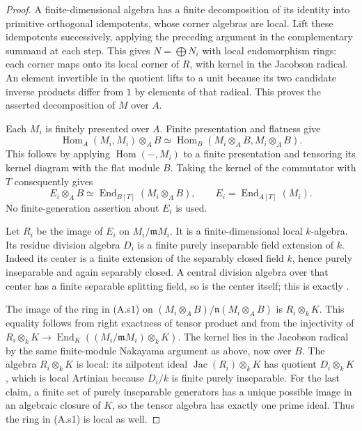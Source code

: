 \begin{proof}
A finite-dimensional algebra has a finite decomposition of its
identity into primitive orthogonal idempotents, whose corner
algebras are local.  Lift these idempotents successively, applying
the preceding argument in the complementary summand at each step.
This gives $N=\bigoplus N_i$ with local endomorphism rings:
each corner maps onto its local corner of $R$, with kernel in the
Jacobson radical.  An element invertible in the quotient lifts to
a unit because its two candidate inverse products differ from
$1$ by elements of that radical.  This proves the asserted
decomposition of $M$ over $A$.

Each $M_i$ is finitely presented over $A$.  Finite presentation
and flatness give
\[
 \operatorname{Hom}_A(M_i,M_i)\otimes_A B
     \simeq\operatorname{Hom}_B(M_i\otimes_A B,M_i\otimes_A B).
\]
This follows by applying $\operatorname{Hom}(-,M_i)$ to a finite
presentation and tensoring its kernel diagram with the flat module
$B$.  Taking the kernel of the commutator with $T$ consequently
gives
\[
 E_i\otimes_A B\simeq
 \operatorname{End}_{B[T]}(M_i\otimes_A B),\qquad
 E_i=\operatorname{End}_{A[T]}(M_i).                 \tag{A.s1}
\]
No finite-generation assertion about $E_i$ is used.

Let $R_i$ be the image of $E_i$ on $M_i/\mathfrak mM_i$.
It is a finite-dimensional local $k$-algebra.  Its residue division
algebra $D_i$ is a finite purely inseparable field extension of $k$.
Indeed its center is a finite extension of the separably closed
field $k$, hence purely inseparable and again separably closed.
A central division algebra over that center has a finite separable
splitting field, so is the center itself; this is exactly
\cite[Proposition 11.8.5 and Lemma 11.8.6(4)]{StacksDivisionSolution}.

The image of the ring in (A.s1) on
$(M_i\otimes_A B)/\mathfrak n(M_i\otimes_A B)$ is
$R_i\otimes_k K$.  This equality follows from right exactness
of tensor product and from the injectivity of
$R_i\otimes_k K\to
\operatorname{End}_K((M_i/\mathfrak mM_i)\otimes_k K)$.
The kernel lies in the Jacobson radical by the same finite-module
Nakayama argument as above, now over $B$.
The algebra $R_i\otimes_k K$ is local: its nilpotent ideal
$\operatorname{Jac}(R_i)\otimes_k K$ has quotient
$D_i\otimes_k K$, which is local Artinian because $D_i/k$ is
finite purely inseparable.  For the last claim, a finite set of
purely inseparable generators has a unique possible image in an
algebraic closure of $K$, so the tensor algebra has exactly one
prime ideal.  Thus the ring in (A.s1) is local as well.
\end{proof}

